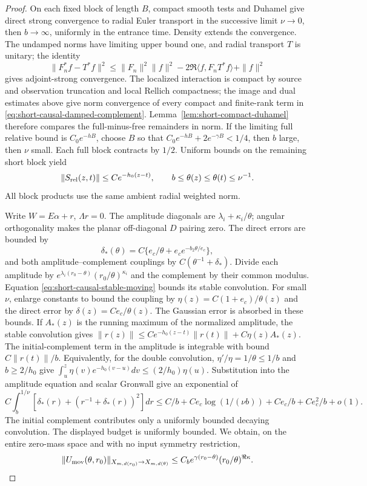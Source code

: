 \begin{proof}
On each fixed block of length $B$, compact smooth tests and Duhamel
give direct strong convergence to radial Euler transport in the
successive limit $\nu\to0$, then $b\to\infty$, uniformly in the
entrance time. Density extends the convergence. The undamped norms
have limiting upper bound one, and radial transport $T$ is unitary;
the identity
\[
 \|F_n^*f-T^*f\|^2\le\|F_n\|^2\|f\|^2
                 -2\Re\langle f,F_nT^*f\rangle+\|f\|^2
\]
gives adjoint-strong convergence. The localized interaction is compact
by source and observation truncation and local Rellich compactness;
the image and dual estimates above give norm convergence of every
compact and finite-rank term in
\eqref{eq:short-causal-damped-complement}. Lemma~\ref{lem:short-compact-duhamel}
therefore compares the full-minus-free remainders in norm. If the
limiting full relative bound is $C_0e^{-hB}$, choose $B$ so that
$C_0e^{-hB}+2e^{-\gamma B}<1/4$, then $b$ large, then $\nu$ small.
Each full block contracts by $1/2$. Uniform bounds on the remaining
short block yield
\begin{equation}\label{eq:short-causal-stable-moving}
 \|S_{\rm rel}(z,t)\|\le Ce^{-h_0(z-t)},\qquad
 b\le\theta(z)\le\theta(t)\le\nu^{-1}.
\end{equation}
All block products use the same ambient radial weighted norm.

Write $W=E\alpha+r$, $\Lambda r=0$. The amplitude diagonals are
$\lambda_i+\kappa_i/\theta$; angular orthogonality makes the planar
off-diagonal $D$ pairing zero. The direct errors are bounded by
\[
 \delta_*(\theta)=C\{e_c/\theta+e_c e^{-b_2\theta/e_c}\},
\]
and both amplitude--complement couplings by
$C(\theta^{-1}+\delta_*)$. Divide each amplitude by
$e^{\lambda_i(r_0-\theta)}(r_0/\theta)^{\kappa_i}$ and the
complement by their common modulus. Equation
\eqref{eq:short-causal-stable-moving} bounds its stable convolution.
For small $\nu$, enlarge constants to bound the coupling by
$\eta(z)=C(1+e_c)/\theta(z)$ and the direct error by
$\delta(z)=Ce_c/\theta(z)$. The Gaussian error is absorbed in
these bounds. If $A_*(z)$ is the running maximum of the normalized
amplitude, the stable convolution gives
$\|r(z)\|\le Ce^{-h_0(z-t)}\|r(t)\|+C\eta(z)A_*(z)$.
The initial-complement term in the amplitude is integrable with
bound $C\|r(t)\|/b$. Equivalently, for the double convolution,
$\eta'/\eta=1/\theta\le1/b$ and $b\ge2/h_0$ give
$\int_u^z\eta(v)e^{-h_0(v-u)}dv\le(2/h_0)\eta(u)$.
Substitution into the amplitude equation and scalar Gronwall give
an exponential of
\[
 C\int_b^{1/\nu}[\delta_*(r)+(r^{-1}+\delta_*(r))^2]dr
 \le C/b+Ce_c\log(1/(\nu b))+Ce_c/b+Ce_c^2/b+o(1).
\]
The initial complement contributes only a uniformly bounded decaying
convolution. The displayed budget is uniformly bounded. We obtain,
on the entire zero-mass space and with no input symmetry restriction,
\begin{equation}\label{eq:short-causal-long-forward}
 \|U_{\rm mov}(\theta,r_0)\|_{X_{m,d(r_0)}\to X_{m,d(\theta)}}
 \le C_b e^{\gamma(r_0-\theta)}(r_0/\theta)^{\Re\kappa}.
\end{equation}


\end{proof}
